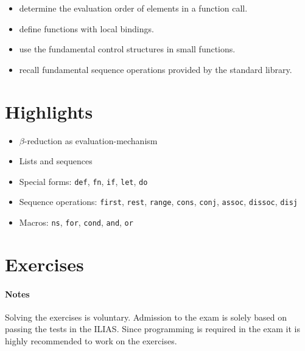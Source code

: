 \documentclass[11pt,a4paper]{article}
\begin{document}
\begin{itemize}
	\item determine the evaluation order of elements in a function call.
    \item define functions with local bindings.
    \item use the fundamental control structures in small functions.
    \item recall fundamental sequence operations provided by the standard library.
\end{itemize}

\section{Highlights}

\begin{itemize}
    \item $\beta$-reduction as evaluation-mechanism
    \item Lists and sequences
    \item Special forms: \verb|def|, \verb|fn|, \verb|if|, \verb|let|, \verb|do|
    \item Sequence operations: \verb|first|, \verb|rest|, \verb|range|, \verb|cons|, \verb|conj|, \verb|assoc|, \verb|dissoc|, \verb|disj|
    \item Macros: \verb|ns|, \verb|for|, \verb|cond|, \verb|and|, \verb|or|
\end{itemize}



\section{Exercises}

\paragraph{Notes}
Solving the exercises is voluntary.
Admission to the exam is solely based on passing the tests in the ILIAS.
Since programming is required in the exam
it is highly recommended to work on the exercises.

%
\end{document}
